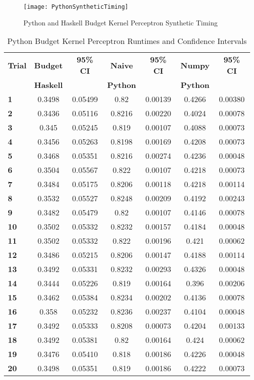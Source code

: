 \begin{figure}[p]
 \caption{Python and Haskell Budget Kernel Perceptron Synthetic Timing}
 \label{SyntheticPythonHaskellTiming}
 \texttt{[image: PythonSyntheticTiming]}
\end{figure}

\begin{table}[p]
 \begin{center}
  \caption{Python Budget Kernel Perceptron Runtimes and Confidence Intervals}
  \label{tab:pythontiming}
  \begin{tabular}{l|c|c|c|c|c|c}
  \textbf{Trial} & \textbf{Budget} & \textbf{95\% CI} & \textbf{Naive} & \textbf{95\% CI} & \textbf{Numpy} & \textbf{95\% CI}\\
  \textbf{} & \textbf{Haskell} & \textbf{} & \textbf{Python} & \textbf{} & \textbf{Python}\\
  \hline
  \textbf{1} & 0.3498 & 0.05499 & 0.82 & 0.00139 & 0.4266 & 0.00380\\
  \textbf{2} & 0.3436 & 0.05116 & 0.8216 & 0.00220 & 0.4024 & 0.00078\\
  \textbf{3} & 0.345 & 0.05245 & 0.819 & 0.00107 & 0.4088 & 0.00073\\
  \textbf{4} & 0.3456 & 0.05263 & 0.8198 & 0.00169 & 0.4208 & 0.00073\\
  \textbf{5} & 0.3468 & 0.05351 & 0.8216 & 0.00274 & 0.4236 & 0.00048\\
  \textbf{6} & 0.3504 & 0.05567 & 0.822 & 0.00107 & 0.4218 & 0.00073\\
  \textbf{7} & 0.3484 & 0.05175 & 0.8206 & 0.00118 & 0.4218 & 0.00114\\
  \textbf{8} & 0.3532 & 0.05527 & 0.8248 & 0.00209 & 0.4192 & 0.00243\\
  \textbf{9} & 0.3482 & 0.05479 & 0.82 & 0.00107 & 0.4146 & 0.00078\\
  \textbf{10} & 0.3502 & 0.05332 & 0.8232 & 0.00157 & 0.4184 & 0.00048\\
  \textbf{11} & 0.3502 & 0.05332 & 0.822 & 0.00196 & 0.421 & 0.00062\\
  \textbf{12} & 0.3486 & 0.05215 & 0.8206 & 0.00147 & 0.4188 & 0.00114\\
  \textbf{13} & 0.3492 & 0.05331 & 0.8232 & 0.00293 & 0.4326 & 0.00048\\
  \textbf{14} & 0.3444 & 0.05226 & 0.819 & 0.00164 & 0.396 & 0.00206\\
  \textbf{15} & 0.3462 & 0.05384 & 0.8234 & 0.00202 & 0.4136 & 0.00078\\
  \textbf{16} & 0.358 & 0.05232 & 0.8236 & 0.00237 & 0.4104 & 0.00048\\
  \textbf{17} & 0.3492 & 0.05333 & 0.8208 & 0.00073 & 0.4204 & 0.00133\\
  \textbf{18} & 0.3492 & 0.05381 & 0.82 & 0.00164 & 0.424 & 0.00062\\
  \textbf{19} & 0.3476 & 0.05410 & 0.818 & 0.00186 & 0.4226 & 0.00048\\
  \textbf{20} & 0.3498 & 0.05351 & 0.819 & 0.00186 & 0.4222 & 0.00073\\
  \end{tabular}
 \end{center}
\end{table}

